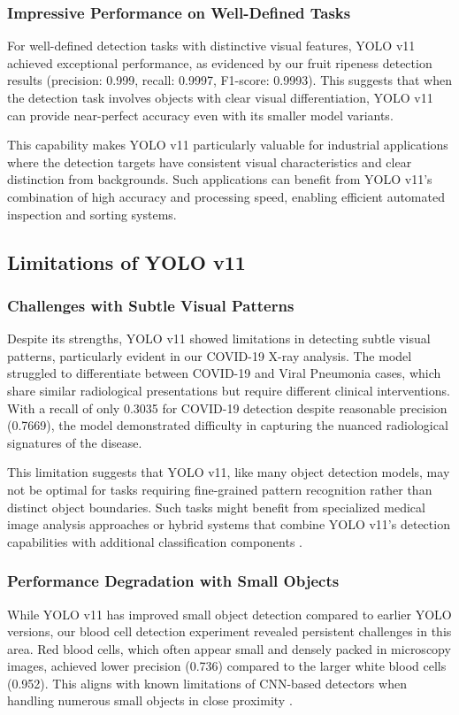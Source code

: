 \begin{multicols}{2}
\subsubsection{Impressive Performance on Well-Defined Tasks}
For well-defined detection tasks with distinctive visual features, YOLO v11 achieved exceptional performance, as evidenced by our fruit ripeness detection results (precision: 0.999, recall: 0.9997, F1-score: 0.9993). This suggests that when the detection task involves objects with clear visual differentiation, YOLO v11 can provide near-perfect accuracy even with its smaller model variants.

This capability makes YOLO v11 particularly valuable for industrial applications where the detection targets have consistent visual characteristics and clear distinction from backgrounds. Such applications can benefit from YOLO v11's combination of high accuracy and processing speed, enabling efficient automated inspection and sorting systems.

\subsection{Limitations of YOLO v11}

\subsubsection{Challenges with Subtle Visual Patterns}
Despite its strengths, YOLO v11 showed limitations in detecting subtle visual patterns, particularly evident in our COVID-19 X-ray analysis. The model struggled to differentiate between COVID-19 and Viral Pneumonia cases, which share similar radiological presentations but require different clinical interventions. With a recall of only 0.3035 for COVID-19 detection despite reasonable precision (0.7669), the model demonstrated difficulty in capturing the nuanced radiological signatures of the disease.

This limitation suggests that YOLO v11, like many object detection models, may not be optimal for tasks requiring fine-grained pattern recognition rather than distinct object boundaries. Such tasks might benefit from specialized medical image analysis approaches or hybrid systems that combine YOLO v11's detection capabilities with additional classification components \citep{electronics8030292}.

\subsubsection{Performance Degradation with Small Objects}
While YOLO v11 has improved small object detection compared to earlier YOLO versions, our blood cell detection experiment revealed persistent challenges in this area. Red blood cells, which often appear small and densely packed in microscopy images, achieved lower precision (0.736) compared to the larger white blood cells (0.952). This aligns with known limitations of CNN-based detectors when handling numerous small objects in close proximity \citep{8627998}.


\end{multicols}

